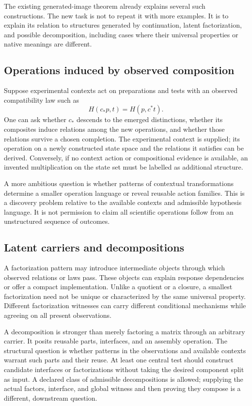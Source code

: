 \documentclass[11pt]{article}
\theoremstyle{remark}
\begin{document}
The existing generated-image theorem already explains several such constructions. The new task is not to repeat it with more examples. It is to explain its relation to structures generated by continuation, latent factorization, and possible decomposition, including cases where their universal properties or native meanings are different.

\subsection{Operations induced by observed composition}

Suppose experimental contexts act on preparations and tests with an observed compatibility law such as
\begin{equation}
 H(c_*p,t)=H(p,c^*t).
 \label{eq:context-duality}
\end{equation}
One can ask whether $c_*$ descends to the emerged distinctions, whether its composites induce relations among the new operations, and whether those relations survive a chosen completion. The experimental context is supplied; its operation on a newly constructed state space and the relations it satisfies can be derived. Conversely, if no context action or compositional evidence is available, an invented multiplication on the state set must be labelled as additional structure.

A more ambitious question is whether patterns of contextual transformations determine a smaller operation language or reveal reusable action families. This is a discovery problem relative to the available contexts and admissible hypothesis language. It is not permission to claim all scientific operations follow from an unstructured sequence of outcomes.

\subsection{Latent carriers and decompositions}

A factorization pattern may introduce intermediate objects through which observed relations or laws pass. These objects can explain response dependencies or offer a compact implementation. Unlike a quotient or a closure, a smallest factorization need not be unique or characterized by the same universal property. Different factorization witnesses can carry different conditional mechanisms while agreeing on all present observations.

A decomposition is stronger than merely factoring a matrix through an arbitrary carrier. It posits reusable parts, interfaces, and an assembly operation. The structural question is whether patterns in the observations and available contexts warrant such parts and their reuse. At least one central test should construct candidate interfaces or factorizations without taking the desired component split as input. A declared class of admissible decompositions is allowed; supplying the actual factors, interface, and global witness and then proving they compose is a different, downstream question.
\end{document}
